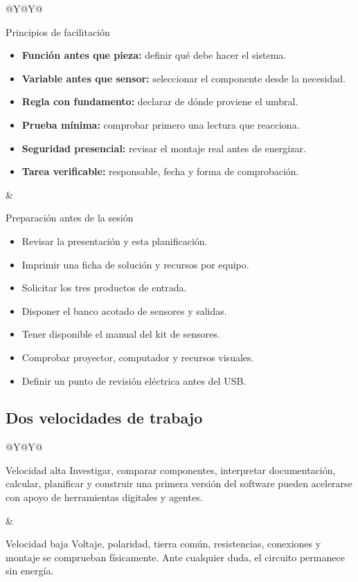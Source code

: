 \documentclass[10pt,a4paper]{article}
\begin{document}
\begin{tabularx}{\textwidth}{@{}Y@{\hspace{5mm}}Y@{}}
\begin{docbox}[height=80mm]{Principios de facilitación}
\begin{itemize}
  \item \textbf{Función antes que pieza:} definir qué debe hacer el sistema.
  \item \textbf{Variable antes que sensor:} seleccionar el componente desde la necesidad.
  \item \textbf{Regla con fundamento:} declarar de dónde proviene el umbral.
  \item \textbf{Prueba mínima:} comprobar primero una lectura que reacciona.
  \item \textbf{Seguridad presencial:} revisar el montaje real antes de energizar.
  \item \textbf{Tarea verificable:} responsable, fecha y forma de comprobación.
\end{itemize}
\end{docbox}
&
\begin{docbox}[height=80mm]{Preparación antes de la sesión}
\begin{itemize}
  \item Revisar la presentación y esta planificación.
  \item Imprimir una ficha de solución y recursos por equipo.
  \item Solicitar los tres productos de entrada.
  \item Disponer el banco acotado de sensores y salidas.
  \item Tener disponible el manual del kit de sensores.
  \item Comprobar proyector, computador y recursos visuales.
  \item Definir un punto de revisión eléctrica antes del USB.
\end{itemize}
\end{docbox}
\end{tabularx}

\subsection{Dos velocidades de trabajo}
\begin{tabularx}{\textwidth}{@{}Y@{\hspace{5mm}}Y@{}}
\begin{docbox}[height=49mm]{Velocidad alta}
Investigar, comparar componentes, interpretar documentación, calcular, planificar y construir una primera versión del software pueden acelerarse con apoyo de herramientas digitales y agentes.
\end{docbox}
&
\begin{docbox}[height=49mm]{Velocidad baja}
Voltaje, polaridad, tierra común, resistencias, conexiones y montaje se comprueban físicamente. Ante cualquier duda, el circuito permanece sin energía.
\end{docbox}
\end{tabularx}
\end{document}
